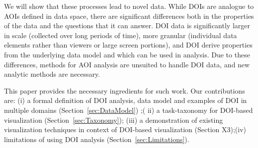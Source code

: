 We will show that these processes lead to novel data. While DOIs are analogue to AOIs defined in data space, there are significant differences both in the properties of the data and the questions that it can answer. DOI data is significantly larger in scale (collected over long periods of time), more granular (individual data elements rather than viewers or large screen portions), and DOI derive properties from the underlying data model and which can be used in analysis. Due to these differences, methods for AOI analysis are unsuited to handle DOI data, and new analytic methods are necessary.  

This paper provides the necessary ingredients for such work. Our contributions are: (i) a formal definition of DOI analysis, data model and examples of DOI in multiple domains (Section~\ref{sec:DataModel}) ;( ii) a task-taxonomy for DOI-based visualization (Section~\ref{sec:Taxonomy}); (iii) a demonstration of existing visualization techniques in context of DOI-based visualization (Section X3);(iv) limitations of using DOI analysis (Section~\ref{sec:Limitations}). 

